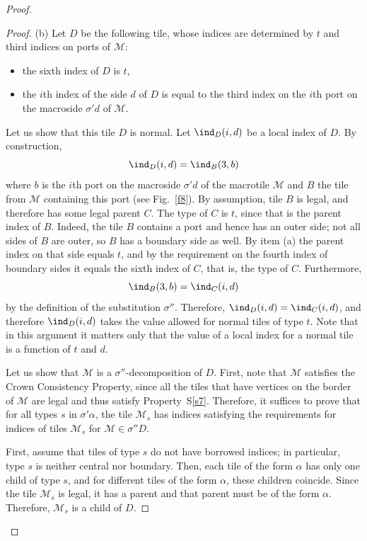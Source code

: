 \documentclass[12pt]{article}
\theoremstyle{remark}
\begin{document}
\begin{proof}
\begin{proof}
(b) Let $D$ be the following tile, whose indices are determined
by $t$ and third  indices on ports of  $\mathcal M$:
\begin{itemize}
\item the sixth index of $D$ is $t$,
\item the $i$th index of the side $d$ of $D$ is equal to the third index on the $i$th 
port on the macroside $\sigma'd$ of $\mathcal M$.
\end{itemize}


Let us show that this tile $D$ is normal. Let $\ind_D(i,d)$ be a local
index of $D$. 
By construction, 
$$
\ind_D(i,d)=\ind_B(3,b)
$$
where $b$ is the $i$th port
on the macroside $\sigma'd$ of the macrotile $\mathcal M$ and 
$B$ the tile from $\mathcal M$ containing this port (see Fig.~\ref{f8}). 
By assumption,
tile $B$ is legal, and therefore has some legal parent $C$.
The type of $C$ is $t$, since that is the parent index of $B$. Indeed, the tile $B$ contains a
port and hence has an outer side; not all sides of $B$ are outer, so $B$ has a boundary side as
well. By item (a) the parent index on that side equals $t$, and by the requirement on the fourth
index of boundary sides it equals the sixth index of $C$, that is, the type of $C$.
Furthermore,
$$
\ind_B(3,b)=\ind_C(i,d)
$$
by the definition of the substitution $\sigma''$.
Therefore, $\ind_D(i,d)=\ind_C(i,d)$,
and therefore $\ind_D(i,d)$ takes the value allowed for normal tiles of type $t$.
Note that in this argument it matters only that the value of a local index for a normal 
tile is a function of $t$ and $d$.

Let us show
that $\mathcal M$ is a $\sigma''$-decomposition of $D$.
First, note that $\mathcal M$ satisfies the Crown Consistency Property,
since all the tiles that have vertices on the border of $\mathcal M$ are  legal and 
thus satisfy Property~S\ref{s7}. Therefore,
it suffices to prove that
for all types $s$ in $\sigma'\alpha$, the tile $\mathcal M_s$
has indices satisfying the requirements for indices of tiles
$\mathcal M_s$ for $\mathcal M\in\sigma''D$.

First, assume that tiles of type $s$ do not have borrowed indices; in particular, type $s$ is neither central nor boundary.
Then, each tile of the form $\alpha$
has only one child of type $s$, and for different tiles of the form $\alpha$,
these children coincide.
Since the tile $\mathcal M_s$ is legal, it has a parent and that parent must be of the form $\alpha$.
Therefore, $\mathcal M_s$ is a child of $D$.


\end{proof}
\end{proof}
\end{document}
